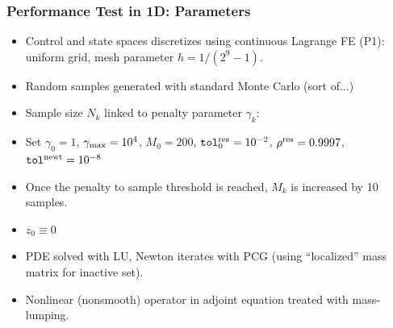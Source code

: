 \documentclass[aspectratio=169,xcolor=dvipsnames,11pt]{beamer}
\begin{document}
\begin{footnotesize}
\begin{frame}\frametitle{Performance Test in 1D: Parameters}
\begin{block}{}
\begin{itemize}
\item Control and state spaces discretizes using continuous Lagrange FE (P1): uniform grid, mesh parameter $h = 1/(2^{9}-1)$.
\item Random samples generated with standard Monte Carlo (sort of...)
\item Sample size $N_k$ linked to penalty parameter $\gamma_k$: 
\item  Set $\gamma_0 = 1$, $\gamma_{\rm max} = 10^4$, $M_0 = 200$, ${\tt tol}^{\rm res}_{0} = 10^{-2}$, $\rho^{\rm res} = 0.9997$, ${\tt tol}^{\rm newt} = 10^{-8}$
\item  Once the penalty to sample threshold is reached, $M_k$ is increased by 10 samples.
\item $z_0 \equiv 0$
\item PDE solved with LU, Newton iterates with PCG (using ``localized'' mass matrix for inactive set).
\item Nonlinear (nonsmooth) operator in adjoint equation treated with mass-lumping.
\end{itemize}
\end{block}

\end{frame}
\end{footnotesize}
\end{document}
